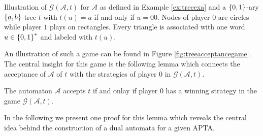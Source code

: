 \begin{drawing}
  \caption{
    Illustration of $\mathcal{G}(\mathcal{A}, t)$ for $\mathcal{A}$ as
    defined in Example \ref{ex:treeexa} and a $\left\{0,1\right\}$-ary $\left\{a,b\right\}$-tree
    $t$ with $t(u) = a$ if and only if $u = 00$. Nodes of player $0$ are 
    circles while player $1$ plays on rectangles. Every triangle is 
    associated with one word $u\in\left\{0,1\right\}^{*}$ and labeled with $t(u)$. 
  }
  \label{fig:treeacceptancegame}
  \begin{center}
  \end{center}
\end{drawing}
An illustration of such a game can be found in Figure 
\ref{fig:treeacceptancegame}. The central insight for this game is the 
following lemma which connects the acceptance of $\mathcal{A}$ of $t$ with the
strategies of player $0$ in $\mathcal{G}(\mathcal{A}, t)$.
\begin{lemma}
  \cite[Lemma 3.1.]{AltTreeAuto}
  The automaton $\mathcal{A}$ accepts $t$ if and onlay if player $0$ has a 
  winning strategy in the game $\mathcal{G}(\mathcal{A}, t)$.
  \label{lem:stratacceptance}
\end{lemma}
In the following we present one proof for this lemma which reveals the 
central idea behind the construction of a dual automata for a given \ac{APTA}.
